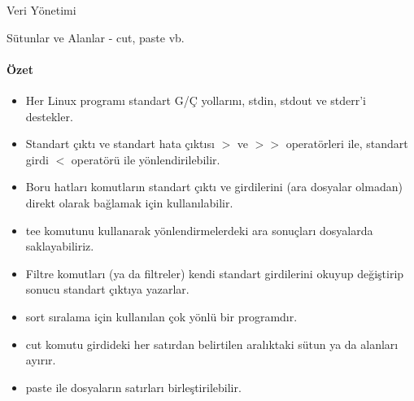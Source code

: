 \begin{section}{Veri Yönetimi}
\begin{subsection}{Sütunlar ve Alanlar - cut, paste vb.}
\paragraph{Özet}{
\begin{itemize}
\item Her Linux programı standart G/Ç yollarını, stdin, stdout ve stderr'i destekler. 
\item Standart çıktı ve standart hata çıktısı $>$ ve $>>$ operatörleri ile, standart girdi $<$ operatörü ile yönlendirilebilir.
\item Boru hatları komutların standart çıktı ve girdilerini (ara dosyalar olmadan) direkt olarak bağlamak için kullanılabilir.
\item tee komutunu kullanarak yönlendirmelerdeki ara sonuçları dosyalarda saklayabiliriz. 
\item Filtre komutları (ya da filtreler) kendi standart girdilerini okuyup değiştirip sonucu standart çıktıya yazarlar.
\item sort sıralama için kullanılan çok yönlü bir programdır.
\item cut komutu girdideki her satırdan belirtilen aralıktaki sütun ya da alanları ayırır.
\item paste ile dosyaların satırları birleştirilebilir. 
\end{itemize}}
\end{subsection}
\end{section}
